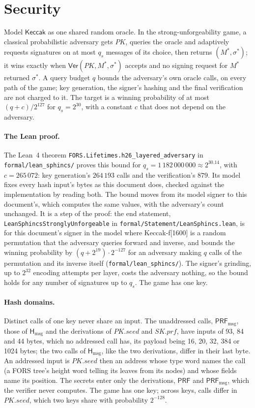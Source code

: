 \documentclass[11pt]{article}
\newcommand{\keccak}{\mathsf{Keccak}}
\newcommand{\PRF}{\mathsf{PRF}}
\newcommand{\PRFmsg}{\mathsf{PRF}_{\mathrm{msg}}}
\newcommand{\Hmsg}{\mathsf{H}_{\mathrm{msg}}}
\newcommand{\Ver}{\mathsf{Ver}}
\newcommand{\PK}{\mathit{PK}}
\newcommand{\pkseed}{\mathit{PK.seed}}
\newcommand{\skprf}{\mathit{SK.prf}}
\begin{document}
\section{Security}
\label{sec:security}

Model $\keccak$ as one shared random oracle. In the strong-unforgeability game, a classical probabilistic adversary gets $\PK$, queries the oracle and adaptively requests signatures on at most $q_s$ messages of its choice, then returns $(M^*,\sigma^*)$; it wins exactly when $\Ver(\PK,M^*,\sigma^*)$ accepts and no signing request for $M^*$ returned $\sigma^*$. A query budget $q$ bounds the adversary's own oracle calls, on every path of the game; key generation, the signer's hashing and the final verification are not charged to it. The target is a winning probability of at most $(q+c)/2^{127}$ for $q_s=2^{30}$, with a constant $c$ that does not depend on the adversary.

\paragraph{The Lean proof.}
The Lean~4 theorem \texttt{FORS.Lifetimes.h26\_layered\_adversary} in \texttt{formal/lean\_sphincs/} proves this bound for $q_s=1\,182\,000\,000\approx2^{30.14}$, with $c=265\,072$: key generation's $264\,193$ calls and the verification's $879$. Its model fixes every hash input's bytes as this document does, checked against the implementation by reading both. The bound moves from its model signer to this document's, which computes the same values, with the adversary's count unchanged. It is a step of the proof: the end statement, \texttt{LeanSphincsStronglyUnforgeable} in \texttt{formal/Statement/LeanSphincs.lean}, is for this document's signer in the model where Keccak-f[1600] is a random permutation that the adversary queries forward and inverse, and bounds the winning probability by $(q+2^{19})\cdot2^{-127}$ for an adversary making $q$ calls of the permutation and its inverse itself (\texttt{formal/lean\_sphincs/}). The signer's grinding, up to $2^{32}$ encoding attempts per layer, costs the adversary nothing, so the bound holds for any number of signatures up to $q_s$. The game has one key.

\paragraph{Hash domains.}
Distinct calls of one key never share an input. The unaddressed calls, $\PRFmsg$, those of $\Hmsg$ and the derivations of $\pkseed$ and $\skprf$, have inputs of 93, 84 and 44 bytes, which no addressed call has, its payload being 16, 20, 32, 384 or 1024 bytes; the two calls of $\Hmsg$, like the two derivations, differ in their last byte. An addressed input is $\pkseed$ then an address whose type word names the call (a FORS tree's height word telling its leaves from its nodes) and whose fields name its position. The secrets enter only the derivations, $\PRF$ and $\PRFmsg$, which the verifier never computes. The game has one key; across keys, calls differ in $\pkseed$, which two keys share with probability $2^{-128}$.
\end{document}
